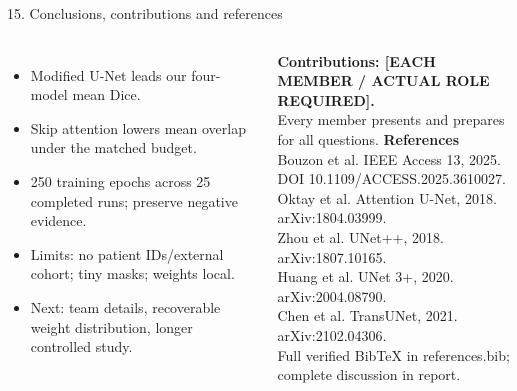 \documentclass[aspectratio=169,11pt]{beamer}
\begin{document}
\begin{frame}{15. Conclusions, contributions and references}
\begin{columns}[T]
\small
\begin{itemize}
\item Modified U-Net leads our four-model mean Dice.
\item Skip attention lowers mean overlap under the matched budget.
\item 250 training epochs across 25 completed runs; preserve negative evidence.
\item Limits: no patient IDs/external cohort; tiny masks; weights local.
\item Next: team details, recoverable weight distribution, longer controlled study.
\end{itemize}
\textbf{Contributions: [EACH MEMBER / ACTUAL ROLE REQUIRED].}\\
Every member presents and prepares for all questions.
\scriptsize
\textbf{References}\\\medskip
Bouzon et al. IEEE Access 13, 2025. DOI 10.1109/ACCESS.2025.3610027.\\\medskip
Oktay et al. Attention U-Net, 2018. arXiv:1804.03999.\\\medskip
Zhou et al. UNet++, 2018. arXiv:1807.10165.\\\medskip
Huang et al. UNet 3+, 2020. arXiv:2004.08790.\\\medskip
Chen et al. TransUNet, 2021. arXiv:2102.04306.\\\medskip
Full verified BibTeX in references.bib; complete discussion in report.
\end{columns}
\end{frame}
\end{document}
